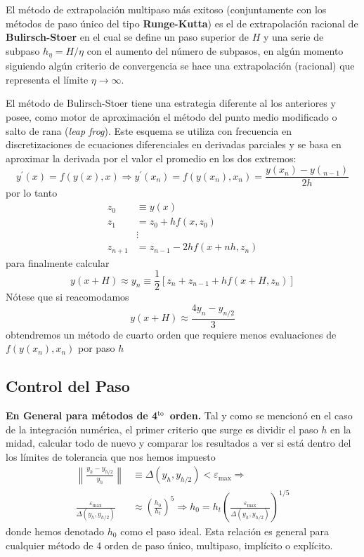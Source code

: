 \documentclass[spanish,titlepage,11pt]{article}
\begin{document}
El m\'{e}todo de extrapolaci\'{o}n multipaso m\'{a}s exitoso (conjuntamente
con los m\'{e}todos de paso \'{u}nico del tipo \textbf{Runge-Kutta}) es el de
extrapolaci\'{o}n racional de \textbf{Bulirsch-Stoer} en el cual se define un
paso superior de $H$ y una serie de subpaso $h_{\eta}=H/\eta$ con el aumento
del n\'{u}mero de subpasos, en alg\'{u}n momento siguiendo alg\'{u}n criterio
de convergencia se hace una extrapolaci\'{o}n (racional) que representa el
l\'{i}mite $\eta\rightarrow\infty.$

El m\'{e}todo de Bulirsch-Stoer tiene una estrategia diferente al los
anteriores y posee, como motor de aproximaci\'{o}n el m\'{e}todo del punto
medio modificado o salto de rana (\textit{leap frog}). Este esquema se utiliza
con frecuencia en discretizaciones de ecuaciones diferenciales en derivadas
parciales y se basa en aproximar la derivada por el valor el promedio en los
dos extremos:
\[
y^{\prime}(x)=f(y(x),x)\Rightarrow y^{\prime}(x_{n})=f(y(x_{n}),x_{n}%
)=\frac{y(x_{n})-y(_{n-1})}{2h}
\]
por lo tanto
\begin{align*}
z_{0}  &  \equiv y(x)\\
z_{1}  &  =z_{0}+hf(x,z_{0})\\
&  \vdots\\
z_{n+1}  &  =z_{n-1}-2hf(x+nh,z_{n})
\end{align*}
para finalmente calcular
\[
y(x+H)\approx y_{n}\equiv\frac{1}{2}\left[  z_{n}+z_{n-1}+hf\left(
x+H,z_{n}\right)  \right]
\]
N\'{o}tese que si reacomodamos
\[
y(x+H)\approx\frac{4y_{n}-y_{n/2}}{3}
\]
obtendremos un m\'{e}todo de cuarto orden que requiere menos evaluaciones de
$f(y(x_{n}),x_{n})$ por paso $h$

\subsection{Control del Paso}

\textbf{En General para m\'{e}todos de 4}$^{\text{to}}$\textbf{\ orden. }Tal y
como se mencion\'{o} en el caso de la integraci\'{o}n num\'{e}rica, el primer
criterio que surge es dividir el paso $h$ en la midad, calcular todo de nuevo
y comparar los resultados a ver si est\'{a} dentro del los l\'{i}mites de
tolerancia que nos hemos impuesto
\begin{align*}
\left\|  \frac{y_{h}-y_{h/2}}{y_{h}}\right\|   &  \equiv\Delta\left(
y_{h},y_{h/2}\right)  <\varepsilon_{\max}\Rightarrow\\
\frac{\varepsilon_{\max}}{\Delta\left(  y_{h},y_{h/2}\right)  }  &
\approx\left(  \frac{h_{0}}{h_{t}}\right)  ^{5}\Rightarrow h_{0}=h_{t}\left(
\frac{\varepsilon_{\max}}{\Delta\left(  y_{h},y_{h/2}\right)  }\right)  ^{1/5}%
\end{align*}
donde hemos denotado $h_{0}$ como el paso ideal. Esta relaci\'{o}n es general
para cualquier m\'{e}todo de 4 orden de paso \'{u}nico, multipaso,
impl\'{i}cito o expl\'{i}cito.
\end{document}
